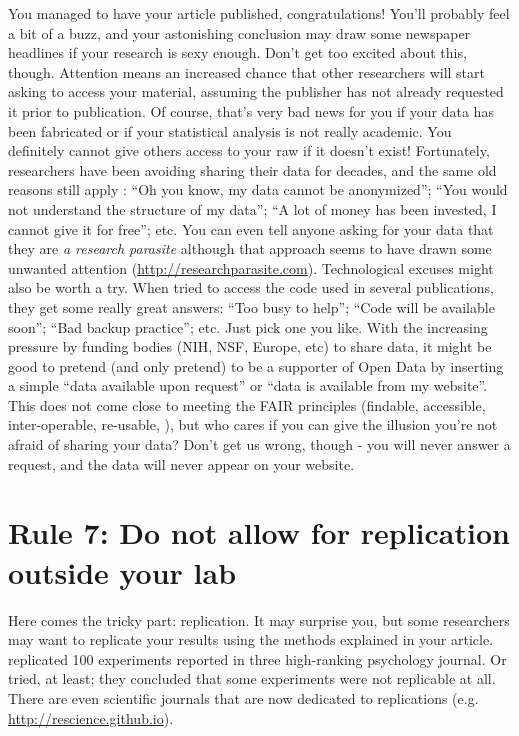 \documentclass[a4paper,10pt,onecolumn]{article}
\begin{document}
You managed to have your article published, congratulations! You'll probably
feel a bit of a buzz, and your astonishing conclusion may draw some
newspaper headlines if your research is sexy enough. Don't get too excited about this, though. Attention means an increased chance that other researchers will start asking to access your
material, assuming the publisher has not already requested it prior to
publication. Of course, that's very bad news for you if your data
has been fabricated or if your statistical analysis is not really academic. You definitely cannot give others access to your raw if it doesn't exist! Fortunately, researchers have been avoiding sharing their data for decades, and the same old
reasons still apply
\citep{roche:2014}: ``Oh you know, my data cannot be anonymized''; ``You
would not understand the structure of my data''; ``A lot of money has been
invested, I cannot give it for free''; etc. You can even tell anyone
asking for your data that they are {\em a research parasite} \citep{longo:2016}
although that approach seems to have drawn some unwanted attention
(\url{http://researchparasite.com}).  Technological excuses might also be worth
a try. When \citep{collberg:2014,collberg:2015} tried to access the code used in
several publications, they get some really great answers: ``Too busy to help'';
``Code will be available soon''; ``Bad backup practice''; etc. Just pick one
you like. With the increasing pressure by funding bodies (NIH, NSF,
Europe, etc) to share data, it might be good to pretend (and only pretend) to be a
supporter of Open Data by inserting a simple ``data available upon request'' or
``data is available from my website''. This does not come close to meeting the
FAIR principles (findable, accessible, inter-operable, re-usable,
\cite{wilkinson:2016}), but who cares if you can give the illusion you're not
afraid of sharing your data? Don't get us wrong, though - you will never answer a
request, and the data will never appear on your website.


\section*{Rule 7: Do not allow for replication outside your lab}

Here comes the tricky part: replication. It may surprise you, but some researchers
may want to replicate your results using the methods explained in your
article. \citep{nosek:2015} replicated 100 experiments reported in three high-ranking psychology journal. Or tried, at least; they
concluded that some experiments were not replicable at all. There are even scientific journals that are now dedicated to replications
(e.g. \url{http://rescience.github.io}). 
\end{document}
